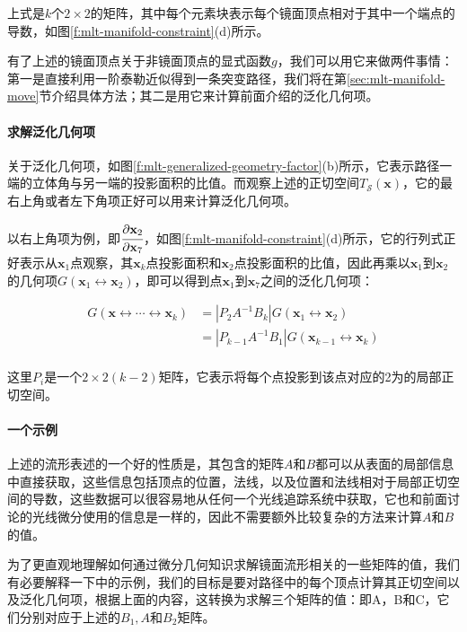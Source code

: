 \noindent 上式是$k$个$2\times 2$的矩阵，其中每个元素块表示每个镜面顶点相对于其中一个端点的导数，如图\ref{f:mlt-manifold-constraint}(d)所示。

有了上述的镜面顶点关于非镜面顶点的显式函数$g$，我们可以用它来做两件事情：第一是直接利用一阶泰勒近似得到一条突变路径，我们将在第\ref{sec:mlt-manifold-move}节介绍具体方法；其二是用它来计算前面介绍的泛化几何项。




\paragraph{求解泛化几何项}
关于泛化几何项，如图\ref{f:mlt-generalized-geometry-factor}(b)所示，它表示路径一端的立体角与另一端的投影面积的比值。而观察上述的正切空间$T_{\mathcal{S}}({\mathbf{x}})$，它的最右上角或者左下角项正好可以用来计算泛化几何项。

以右上角项为例，即$\cfrac{{\rm \partial} \mathbf{x}_2}{{\rm \partial} \mathbf{x}_7}$，如图\ref{f:mlt-manifold-constraint}(d)所示，它的行列式正好表示从$\mathbf{x}_1$点观察，其$\mathbf{x}_k$点投影面积和$\mathbf{x}_2$点投影面积的比值，因此再乘以$\mathbf{x}_1$到$\mathbf{x}_2$的几何项$G(\mathbf{x}_1\leftrightarrow\mathbf{x}_2)$，即可以得到点$\mathbf{x}_1$到$\mathbf{x}_7$之间的泛化几何项：

\begin{equation}
\begin{aligned}	
	G(\mathbf{x}\leftrightarrow\cdots\leftrightarrow\mathbf{x}_k)&=|P_2A^{-1}B_k|G(\mathbf{x}_1\leftrightarrow\mathbf{x}_2)\\
	&=|P_{k-1}A^{-1}B_1|G(\mathbf{x}_{k-1}\leftrightarrow\mathbf{x}_k)\\
\end{aligned}
\end{equation}

\noindent 这里$P_i$是一个$2\times 2(k-2)$矩阵，它表示将每个点投影到该点对应的2为的局部正切空间。




\paragraph{一个示例}
上述的流形表述的一个好的性质是，其包含的矩阵$A$和$B$都可以从表面的局部信息中直接获取，这些信息包括顶点的位置，法线，以及位置和法线相对于局部正切空间的导数，这些数据可以很容易地从任何一个光线追踪系统中获取，它也和前面讨论的光线微分使用的信息是一样的，因此不需要额外比较复杂的方法来计算$A$和$B$的值。

为了更直观地理解如何通过微分几何知识求解镜面流形相关的一些矩阵的值，我们有必要解释一下\cite{a:LIGHTTRANSPORTONPATHSPACEMANIFOLDS,a:ManifoldExplorationExpanded}中的示例，我们的目标是要对路径中的每个顶点计算其正切空间以及泛化几何项，根据上面的内容，这转换为求解三个矩阵的值：即A，B和C，它们分别对应于上述的$B_1,A$和$B_2$矩阵。

